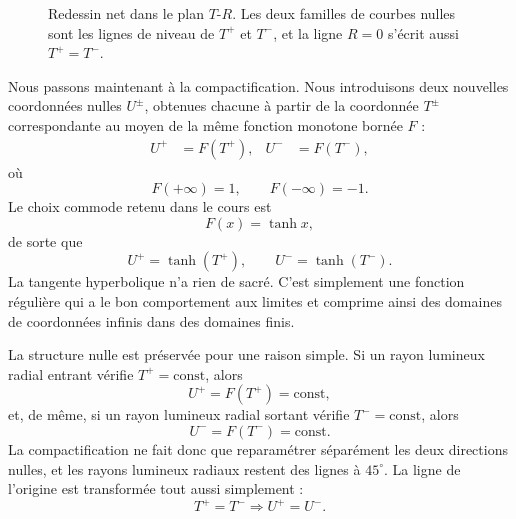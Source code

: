 \begin{figure}[htbp]
\centering
{}
\caption{Redessin net dans le plan \(T\)-\(R\). Les deux familles de courbes nulles sont les lignes de niveau de \(T^+\) et \(T^-\), et la ligne \(R=0\) s’écrit aussi \(T^+=T^-\).}
\end{figure}

Nous passons maintenant à la compactification. Nous introduisons deux nouvelles coordonnées nulles \(U^\pm\), obtenues chacune à partir de la coordonnée \(T^\pm\) correspondante au moyen de la même fonction monotone bornée \(F\) :
\begin{align}
U^+ &= F(T^+), &
U^- &= F(T^-),
\end{align}
où
\begin{equation}
F(+\infty)=1,
\qquad
F(-\infty)=-1.
\end{equation}
Le choix commode retenu dans le cours est
\begin{equation}
F(x)=\tanh x,
\end{equation}
de sorte que
\begin{equation}
U^+ = \tanh(T^+),
\qquad
U^- = \tanh(T^-).
\end{equation}
La tangente hyperbolique n’a rien de sacré. C’est simplement une fonction régulière qui a le bon comportement aux limites et comprime ainsi des domaines de coordonnées infinis dans des domaines finis.

La structure nulle est préservée pour une raison simple. Si un rayon lumineux radial entrant vérifie \(T^+=\text{const}\), alors
\[
U^+=F(T^+)=\text{const},
\]
et, de même, si un rayon lumineux radial sortant vérifie \(T^-=\text{const}\), alors
\[
U^-=F(T^-)=\text{const}.
\]
La compactification ne fait donc que reparamétrer séparément les deux directions nulles, et les rayons lumineux radiaux restent des lignes à \(45^\circ\). La ligne de l’origine est transformée tout aussi simplement :
\[
T^+=T^- \Longrightarrow U^+=U^-.
\]

